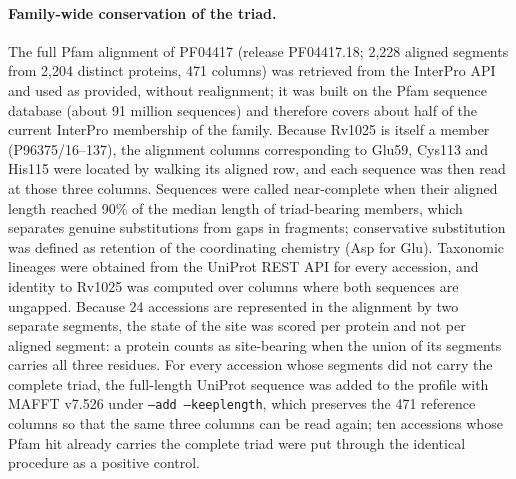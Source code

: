 \documentclass[11pt,a4paper]{article}
\begin{document}
\paragraph{Family-wide conservation of the triad.} The full Pfam alignment of PF04417 (release PF04417.18; 2{,}228 aligned segments from 2{,}204 distinct proteins, 471 columns) was retrieved from the InterPro API and used as provided, without realignment; it was built on the Pfam sequence database (about 91 million sequences) and therefore covers about half of the current InterPro membership of the family. Because Rv1025 is itself a member (P96375/16--137), the alignment columns corresponding to Glu59, Cys113 and His115 were located by walking its aligned row, and each sequence was then read at those three columns. Sequences were called near-complete when their aligned length reached 90\% of the median length of triad-bearing members, which separates genuine substitutions from gaps in fragments; conservative substitution was defined as retention of the coordinating chemistry (Asp for Glu). Taxonomic lineages were obtained from the UniProt REST API for every accession, and identity to Rv1025 was computed over columns where both sequences are ungapped. Because 24 accessions are represented in the alignment by two separate segments, the state of the site was scored per protein and not per aligned segment: a protein counts as site-bearing when the union of its segments carries all three residues. For every accession whose segments did not carry the complete triad, the full-length UniProt sequence was added to the profile with MAFFT v7.526 \citep{katoh2013mafft} under \texttt{--add --keeplength}, which preserves the 471 reference columns so that the same three columns can be read again; ten accessions whose Pfam hit already carries the complete triad were put through the identical procedure as a positive control.
\end{document}
